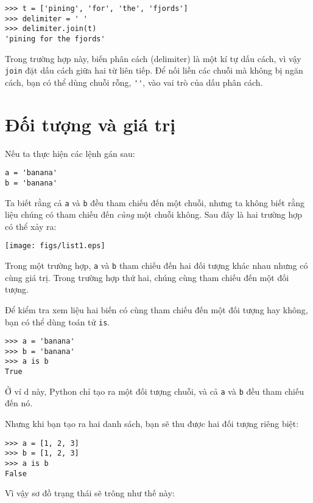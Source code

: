 \documentclass[11pt]{book}
\begin{document}

\beforeverb
\begin{verbatim}
>>> t = ['pining', 'for', 'the', 'fjords']
>>> delimiter = ' '
>>> delimiter.join(t)
'pining for the fjords'
\end{verbatim}
\afterverb
%
Trong trường hợp này, biến phân cách (delimiter) là một
kí tự dấu cách, vì vậy {\tt join} đặt dấu cách giữa
hai từ liên tiếp. Để nối liền các chuỗi mà không bị
ngăn cách, bạn có thể dùng chuỗi rỗng,
\verb"''", vào vai trò của dấu phân cách.



\section{Đối tượng và giá trị}


Nếu ta thực hiện các lệnh gán sau:

\beforeverb
\begin{verbatim}
a = 'banana'
b = 'banana'
\end{verbatim}
\afterverb
%
Ta biết rằng cả {\tt a} và {\tt b} đều tham chiếu
đến một chuỗi, nhưng ta không biết rằng liệu chúng
có tham chiếu đến {\em cùng} một chuỗi không.
Sau đây là hai trường hợp có thể xảy ra:


\beforefig
\centerline{\texttt{[image: figs/list1.eps]}}
\afterfig

Trong một trường hợp, {\tt a} và {\tt b} tham chiếu đến hai đối tượng
khác nhau nhưng có cùng giá trị. Trong trường hợp thứ hai, chúng cùng
tham chiếu đến một đối tượng.


Để kiểm tra xem liệu hai biến có cùng tham chiếu đến một đối tượng 
hay không, bạn có thể dùng toán tử {\tt is}.

\beforeverb
\begin{verbatim}
>>> a = 'banana'
>>> b = 'banana'
>>> a is b
True
\end{verbatim}
\afterverb
%
Ở ví d này, Python chỉ tạo ra một đối tượng chuỗi, và cả
{\tt a} và {\tt b} đều tham chiếu đến nó.

Nhưng khi bạn tạo ra hai danh sách, bạn sẽ thu được
hai đối tượng riêng biệt:

\beforeverb
\begin{verbatim}
>>> a = [1, 2, 3]
>>> b = [1, 2, 3]
>>> a is b
False
\end{verbatim}
\afterverb
%
Vì vậy sơ đồ trạng thái sẽ trông như thế này:
\end{document}
